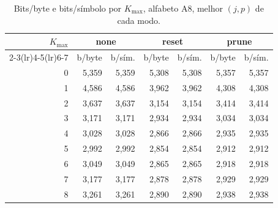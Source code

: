 \begin{table}[H]
\centering
\small
\caption{Bits/byte e bits/s\'imbolo por $K_{\max}$, alfabeto A8, melhor $(j,p)$ de cada modo.}
\label{tab:kmax-A8}
\begin{tabular}{rrrrrrr}
\toprule
$K_{\max}$ & \multicolumn{2}{c}{none} & \multicolumn{2}{c}{reset} & \multicolumn{2}{c}{prune} \\
\cmidrule(lr){2-3}\cmidrule(lr){4-5}\cmidrule(lr){6-7}
 & b/byte & b/s\'im. & b/byte & b/s\'im. & b/byte & b/s\'im. \\
\midrule
0 & 5,359 & 5,359 & 5,308 & 5,308 & 5,357 & 5,357 \\
1 & 4,586 & 4,586 & 3,962 & 3,962 & 4,308 & 4,308 \\
2 & 3,637 & 3,637 & 3,154 & 3,154 & 3,414 & 3,414 \\
3 & 3,171 & 3,171 & 2,934 & 2,934 & 3,034 & 3,034 \\
4 & 3,028 & 3,028 & 2,866 & 2,866 & 2,935 & 2,935 \\
5 & 2,992 & 2,992 & 2,854 & 2,854 & 2,912 & 2,912 \\
6 & 3,049 & 3,049 & 2,865 & 2,865 & 2,918 & 2,918 \\
7 & 3,177 & 3,177 & 2,878 & 2,878 & 2,929 & 2,929 \\
8 & 3,261 & 3,261 & 2,890 & 2,890 & 2,938 & 2,938 \\
\bottomrule
\end{tabular}
\end{table}
